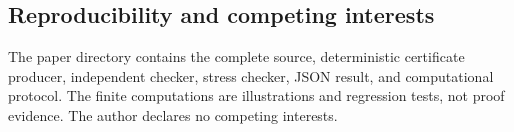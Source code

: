 \subsection{Reproducibility and competing interests}

The paper directory contains the complete source, deterministic certificate
producer, independent checker, stress checker, JSON result, and computational
protocol.  The finite computations are illustrations and regression tests,
not proof evidence.  The author declares no competing interests.
